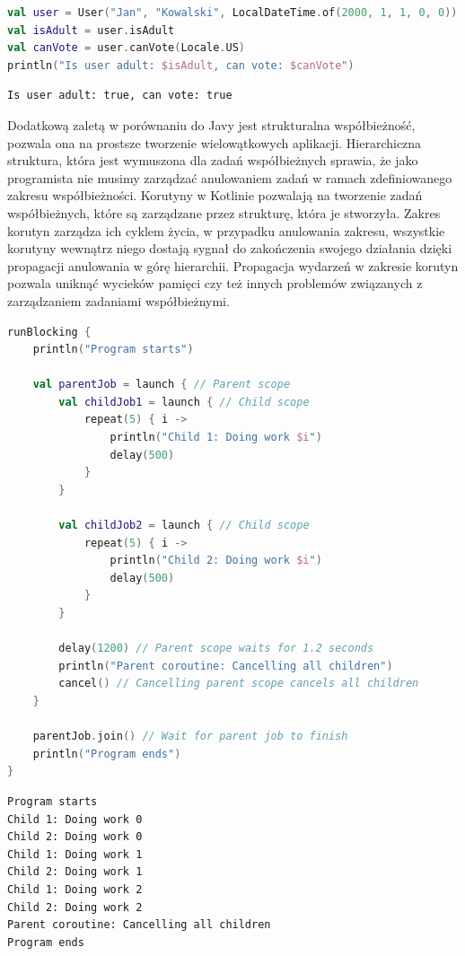 \begin{lstlisting}[caption=Przykład użycia extension functions, language=Kotlin]
val user = User("Jan", "Kowalski", LocalDateTime.of(2000, 1, 1, 0, 0))
val isAdult = user.isAdult
val canVote = user.canVote(Locale.US)
println("Is user adult: $isAdult, can vote: $canVote")
\end{lstlisting}
\begin{lstlisting}[caption=Wynik]
Is user adult: true, can vote: true
\end{lstlisting}
Dodatkową zaletą w porównaniu do Javy jest strukturalna współbieżność, pozwala ona na prostsze tworzenie wielowątkowych aplikacji.
\cite{structuredConcurrency}
Hierarchiczna struktura, która jest wymuszona dla zadań współbieżnych sprawia, że jako programista nie musimy zarządzać anulowaniem zadań w ramach zdefiniowanego zakresu współbieżności.
Korutyny w Kotlinie pozwalają na tworzenie zadań współbieżnych, które są zarządzane przez strukturę, która je stworzyła.\cite{effectiveKotlin}
Zakres korutyn zarządza ich cyklem życia, w przypadku anulowania zakresu, wszystkie korutyny wewnątrz niego dostają sygnał do zakończenia swojego działania dzięki propagacji anulowania w górę hierarchii.
Propagacja wydarzeń w zakresie korutyn pozwala uniknąć wycieków pamięci czy też innych problemów związanych z zarządzaniem zadaniami współbieżnymi.
\begin{lstlisting}[caption=Przykład korutyny w Kotlinie, language=Kotlin]
runBlocking {
    println("Program starts")

    val parentJob = launch { // Parent scope
        val childJob1 = launch { // Child scope
            repeat(5) { i ->
                println("Child 1: Doing work $i")
                delay(500)
            }
        }

        val childJob2 = launch { // Child scope
            repeat(5) { i ->
                println("Child 2: Doing work $i")
                delay(500)
            }
        }

        delay(1200) // Parent scope waits for 1.2 seconds
        println("Parent coroutine: Cancelling all children")
        cancel() // Cancelling parent scope cancels all children
    }

    parentJob.join() // Wait for parent job to finish
    println("Program ends")
}
\end{lstlisting}
\begin{lstlisting}[caption=Wynik]
Program starts
Child 1: Doing work 0
Child 2: Doing work 0
Child 1: Doing work 1
Child 2: Doing work 1
Child 1: Doing work 2
Child 2: Doing work 2
Parent coroutine: Cancelling all children
Program ends
\end{lstlisting}
